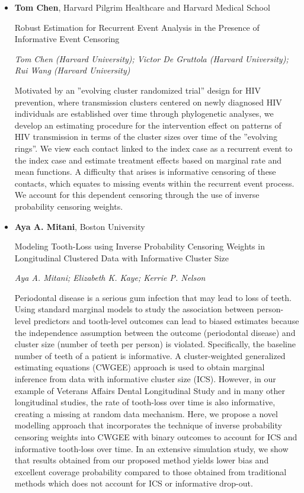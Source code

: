 \begin{itemize}
\item \textbf{Tom Chen}, Harvard Pilgrim Healthcare and Harvard Medical School

Robust Estimation for Recurrent Event Analysis in the Presence of Informative Event Censoring

\emph{\footnotesize Tom Chen (Harvard University); Victor De Gruttola (Harvard University); Rui Wang (Harvard University)}

Motivated by an ''evolving cluster randomized trial'' design for HIV prevention, where transmission clusters centered on newly diagnosed HIV individuals are established over time through phylogenetic analyses, we develop an estimating procedure for the intervention effect on patterns of HIV transmission in terms of the cluster sizes over time of the ''evolving rings''. We view each contact  linked to the index case as a recurrent event to the index case and estimate treatment effects based on marginal rate and mean functions. A difficulty that arises is informative censoring of these contacts, which equates to missing events within the recurrent event process. We account for this dependent censoring through the use of inverse probability censoring weights.

\item \textbf{Aya A. Mitani}, Boston University

Modeling Tooth-Loss using Inverse Probability Censoring Weights in Longitudinal Clustered Data with Informative Cluster Size

\emph{\footnotesize Aya A. Mitani; Elizabeth K. Kaye; Kerrie P. Nelson}

Periodontal disease is a serious gum infection that may lead to loss of teeth. Using standard marginal models to study the association between person-level predictors and tooth-level outcomes can lead to biased estimates because the independence assumption between the outcome (periodontal disease) and cluster size (number of teeth per person) is violated. Specifically, the baseline number of teeth of a patient is informative. A cluster-weighted generalized estimating equations (CWGEE) approach is used to obtain marginal inference from data with informative cluster size (ICS). However, in our example of Veterans Affairs Dental Longitudinal Study and in many other longitudinal studies, the rate of tooth-loss over time is also informative, creating a missing at random data mechanism. Here, we propose a novel modelling approach that incorporates the technique of inverse probability censoring weights into CWGEE with binary outcomes to account for ICS and informative tooth-loss over time. In an extensive simulation study, we show that results obtained from our proposed method yields lower bias and excellent coverage probability compared to those obtained from traditional methods which does not account for ICS or informative drop-out.


\end{itemize}
